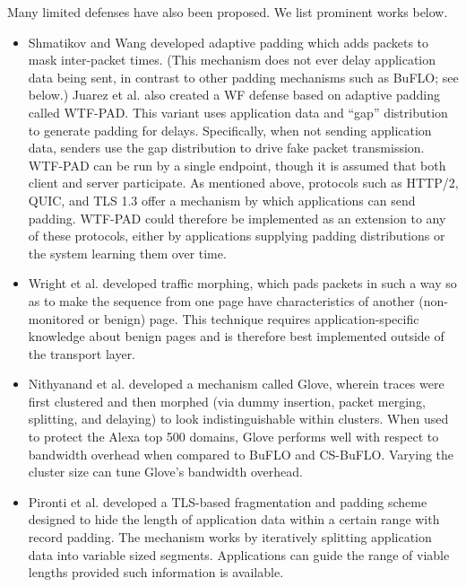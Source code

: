 \documentclass[runningheads]{llncs}
\begin{document}
Many limited defenses have also been proposed. We list prominent works below.
%
\begin{itemize}
\item Shmatikov and Wang \cite{shmatikov2006timing} developed adaptive padding which adds packets to mask
inter-packet times. (This mechanism does not ever delay application data being sent, in contrast to other
padding mechanisms such as BuFLO; see below.)
Juarez et al. \cite{juarez2015wtf,juarez2016toward} also created a WF defense based on adaptive padding called WTF-PAD.
This variant uses application data and ``gap'' distribution to generate padding for delays. Specifically, when
not sending application data, senders use the gap distribution to drive fake packet transmission.
WTF-PAD can be run by a single endpoint, though it is assumed that both client and server participate.
As mentioned above, protocols such as HTTP/2, QUIC, and TLS 1.3 offer a mechanism by which applications can
send padding. WTF-PAD could therefore be implemented as an extension to any of these protocols, either by
applications supplying padding distributions or the system learning them over time.

\item Wright et al. \cite{wright2009traffic} developed traffic morphing, which pads packets in such a way
so as to make the sequence from one page have characteristics of another (non-monitored or benign) page.
This technique requires application-specific knowledge about benign pages and is therefore best implemented
outside of the transport layer.

\item Nithyanand et al. \cite{nithyanand2014glove} developed a mechanism called Glove,
wherein traces were first clustered and then morphed (via dummy insertion, packet
merging, splitting, and delaying) to look indistinguishable within clusters. When used
to protect the Alexa top 500 domains, Glove performs well with respect to bandwidth
overhead when compared to BuFLO and CS-BuFLO. Varying the cluster size can tune
Glove's bandwidth overhead.

\item Pironti et al. \cite{pironti2012identifying} developed a TLS-based fragmentation and padding
scheme designed to hide the length of application data within a certain range with record padding.
The mechanism works by iteratively splitting application data into variable sized segments. Applications
can guide the range of viable lengths provided such information is available.


\end{itemize}
\end{document}
